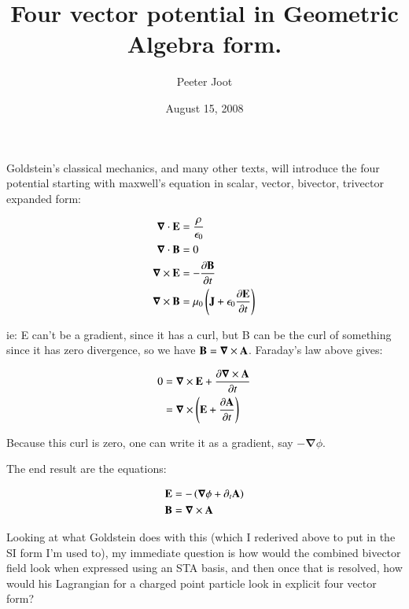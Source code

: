 \documentclass{article}
\title{ Four vector potential in Geometric Algebra form. }
\author{Peeter Joot}
\date{August 15, 2008}
\newcommand{\spacegrad}[0]{\boldsymbol{\nabla}}
\begin{document}
             

\maketitle{}

\section{ }

Goldstein's classical mechanics, and many other texts, will introduce the four potential starting with 
maxwell's equation in scalar, vector, bivector, trivector expanded form:

\begin{align*}
\spacegrad \cdot \BE &= \frac{\rho}{\epsilon_0} \\
\spacegrad \cdot \BB &= 0 \\
\spacegrad \cross \BE &= - \frac{\partial \BB}{\partial t} \\
\spacegrad \cross \BB &= \mu_0\left(\BJ + \epsilon_0 \frac{\partial \BE}{\partial t}\right) \\
\end{align*}

ie: E can't be a gradient, since it has a curl, but B can be the curl of something since it has zero
divergence, so we have $\BB = \spacegrad \cross \BA$.  Faraday's law above gives:

\begin{align*}
0 &= \spacegrad \cross \BE + \frac{\partial \spacegrad \cross \BA}{\partial t} \\
&= \spacegrad \cross \left(\BE + \frac{\partial \BA}{\partial t}\right) \\
\end{align*}

Because this curl is zero, one can write it as a gradient, say $-\spacegrad \phi$.

The end result are the equations:

\begin{align}
\BE &= - \left( \spacegrad \phi + \partial_t \BA \right) \label{eqn:BE} \\
\BB &= \spacegrad \cross \BA \label{eqn:BB} 
\end{align}

Looking at what Goldstein does with this (which I rederived above to put in the SI form I'm used to), my
immediate question is how would the combined bivector field look when expressed using an STA basis, and 
then once that is resolved, how would his Lagrangian for a charged point particle look in explicit four
vector form?
\end{document}
